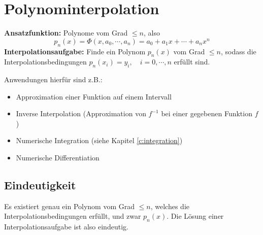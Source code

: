\documentclass[a4paper, 11pt, accentcolor = tud3b]{tudreport}
\begin{document}
	    \section{Polynominterpolation}
	        \textbf{Ansatzfunktion:} Polynome vom Grad \( \leq n \), also
		    \begin{equation*}
			    p_n(x) = \Phi(x, a_0, \cdots, a_n) = a_0 + a_1 x + \cdots + a_n x^n
		    \end{equation*}
		    \textbf{Interpolationsaufgabe:} Finde ein Polynom \( p_n(x) \) vom Grad \( \leq n \), sodass die Interpolationsbedingungen \( p_n(x_i) = y_i, \quad i = 0, \cdots, n \) erfüllt sind.
		    
		    Anwendungen hierfür sind z.B.:
		    \begin{itemize}
		    	\item Approximation einer Funktion auf einem Intervall
		    	\item Inverse Interpolation (Approximation von \(f^{-1}\) bei einer gegebenen Funktion \(f\))
		    	\item Numerische Integration (siehe Kapitel \ref{c:integration})
		    	\item Numerische Differentiation
		    \end{itemize}
	
	        \subsection{Eindeutigkeit}
	            Es existiert genau ein Polynom vom Grad \( \leq n \), welches die Interpolationsbedingungen erfüllt, und zwar \(p_n(x)\). Die Lösung einer Interpolationsaufgabe ist also eindeutig.
	
\end{document}

